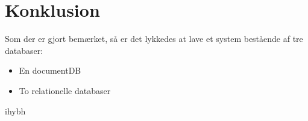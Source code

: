 
\section{Konklusion}

Som der er gjort bemærket, så er det lykkedes at lave et system bestående af tre databaser:


\begin{itemize}
    \item En documentDB
    \item To relationelle databaser 
\end{itemize}


ihybh